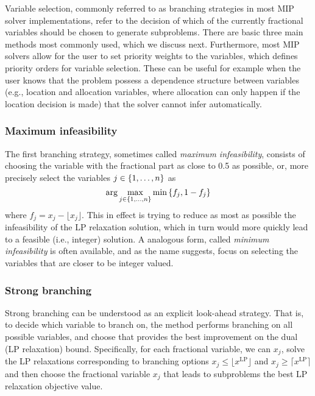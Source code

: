 Variable selection, commonly referred to as branching strategies in most MIP solver implementations, refer to the decision of which of the currently fractional variables should be chosen to generate subproblems. There are basic three main methods most commonly used, which we discuss next. Furthermore, most MIP solvers allow for the user to set priority weights to the variables, which defines priority orders for variable selection. These can be useful for example when the user knows that the problem possess a dependence structure between variables (e.g., location and allocation variables, where allocation can only happen if the location decision is made) that the solver cannot infer automatically. 


\subsubsection{Maximum infeasibility}

The first branching strategy, sometimes called \emph{maximum infeasibility}, consists of choosing the variable with the fractional part as close to 0.5 as possible, or, more precisely select the variables $j \in \left\{ 1, \dots, n \right \}$ as
%
\begin{equation*}
	\arg\max_{j \in \left\{ 1,\dots,n \right \}} \min\left\{ f_j, 1 - f_j \right \} 	
\end{equation*}
%
where $f_j = x_j - \lfloor x_j \rfloor$. This in effect is trying to reduce as most as possible the infeasibility of the LP relaxation solution, which in turn would more quickly lead to a feasible (i.e., integer) solution. A analogous form, called \emph{minimum infeasibility} is often available, and as the name suggests, focus on selecting the variables that are closer to be integer valued.

\subsubsection{Strong branching}

Strong branching can be understood as an explicit look-ahead strategy. That is, to decide which variable to branch on, the method performs branching on all possible variables, and choose that provides the best improvement on the dual (LP relaxation) bound. Specifically, for each fractional variable, we can $x_j$, solve the LP relaxations corresponding to branching options $x_j \leq \lfloor x^\text{LP} \rfloor$ and $x_j \geq \lceil x^\text{LP} \rceil$ and then choose the fractional variable $x_j$ that leads to subproblems the best LP relaxation objective value.


